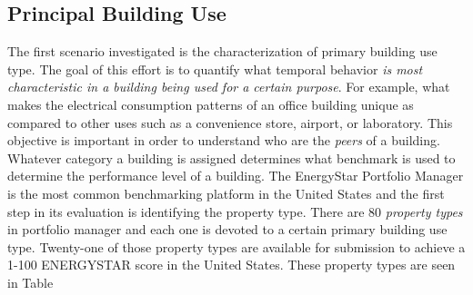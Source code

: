 \subsection{Principal Building Use}
\label{sec:buildinguse}

The first scenario investigated is the characterization of primary building use type. The goal of this effort is to quantify what temporal behavior \emph{is most characteristic in a building being used for a certain purpose}. For example, what makes the electrical consumption patterns of an office building unique as compared to other uses such as a convenience store, airport, or laboratory. This objective is important in order to understand who are the \emph{peers} of a building. Whatever category a building is assigned determines what benchmark is used to determine the performance level of a building. The EnergyStar Portfolio Manager is the most common benchmarking platform in the United States and the first step in its evaluation is identifying the property type. There are 80 \emph{property types} in portfolio manager and each one is devoted to a certain primary building use type. Twenty-one of those property types are available for submission to achieve a 1-100 ENERGYSTAR score in the United States. These property types are seen in Table